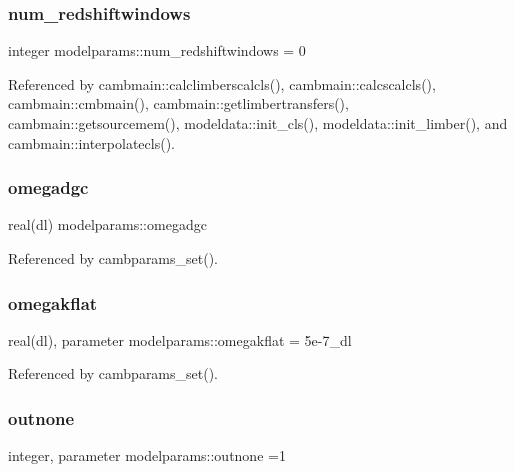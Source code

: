 \subsubsection{\texorpdfstring{num\+\_\+redshiftwindows}{num\_redshiftwindows}}
{\footnotesize\ttfamily integer modelparams\+::num\+\_\+redshiftwindows = 0}



Referenced by cambmain\+::calclimberscalcls(), cambmain\+::calcscalcls(), cambmain\+::cmbmain(), cambmain\+::getlimbertransfers(), cambmain\+::getsourcemem(), modeldata\+::init\+\_\+cls(), modeldata\+::init\+\_\+limber(), and cambmain\+::interpolatecls().

\mbox{\label{namespacemodelparams_a84817ace19c07faa219c6c62dbcabb87}} 
\subsubsection{\texorpdfstring{omegadgc}{omegadgc}}
{\footnotesize\ttfamily real(dl) modelparams\+::omegadgc}



Referenced by cambparams\+\_\+set().

\mbox{\label{namespacemodelparams_a1945ea0e00217f55d85995eeae03eb18}} 
\subsubsection{\texorpdfstring{omegakflat}{omegakflat}}
{\footnotesize\ttfamily real(dl), parameter modelparams\+::omegakflat = 5e-\/7\+\_\+dl}



Referenced by cambparams\+\_\+set().

\mbox{\label{namespacemodelparams_a08fb4afbafc2828da55e9684f24d8d6f}} 
\subsubsection{\texorpdfstring{outnone}{outnone}}
{\footnotesize\ttfamily integer, parameter modelparams\+::outnone =1}



